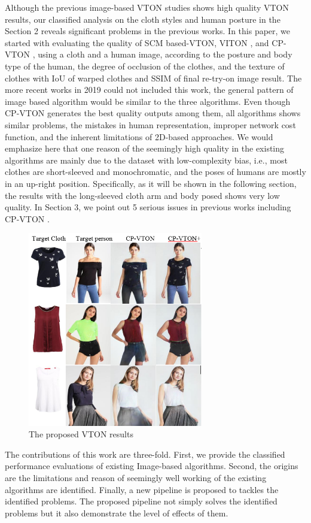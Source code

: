 Although the previous image-based VTON studies shows high quality VTON results, our classified analysis on the cloth styles and human posture in the Section 2 reveals significant problems in the previous works. In this paper, we started with evaluating the quality of SCM\cite{BelongieMP02} based-VTON, VITON \cite{Han2017VITONAI}, and CP-VTON \cite{Wang2018TowardCI}, using a cloth and a human image, according to the posture and body type of the human, the degree of occlusion of the clothes, and the texture of clothes with IoU of warped clothes and SSIM of final re-try-on image result. The more recent works in 2019 could not included this work, the general pattern of image based algorithm would be similar to the three algorithms. Even though CP-VTON generates the best quality outputs among them, all algorithms shows similar problems, the mistakes in human representation, improper network cost function, and the inherent limitations of 2D-based approaches.   
%
We would emphasize here that one reason of the seemingly high quality in the existing algorithms are mainly due to the dataset with low-complexity bias, i.e., most clothes are short-sleeved  and monochromatic, and the poses of humans are mostly in an up-right position. Specifically, as it will be shown in the following section, the results with the long-sleeved cloth arm and body posed shows very low quality. In Section 3, we point out 5 serious issues in previous works including CP-VTON \cite{Wang2018TowardCI}.  


\begin{figure}
\centering
\includegraphics[height=8.5cm, scale=1]{figures/cpvton_cpvton+keyresult.png}   %
\caption{The proposed VTON results}
\label{fig:cpvton_cpvton+keyresult}
\end{figure}

The contributions of this work are three-fold. First, we provide the classified performance evaluations of existing Image-based algorithms. Second, the origins are the limitations and reason of seemingly well working of the existing algorithms are  identified. Finally, a new pipeline is proposed to tackles the identified problems. The proposed pipeline not simply solves the identified problems but it also demonstrate the level of effects of them.
